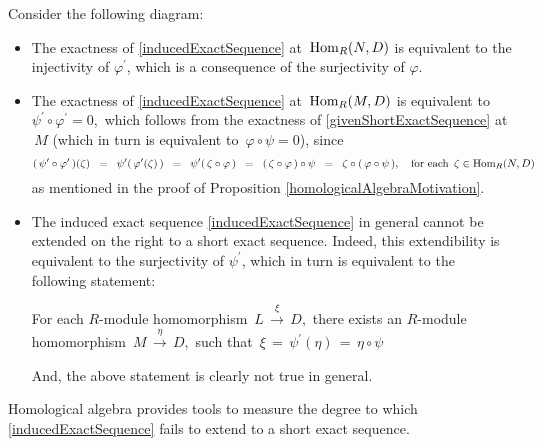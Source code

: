 \vskip 0.5cm
\begin{remark}
\mbox{}
\vskip 0.1cm
\noindent
Consider the following diagram:
\begin{center}
\end{center}
\begin{itemize}
\item
	The exactness of \eqref{inducedExactSequence} at \,$\textnormal{Hom}_{R}(N,D)$
	is equivalent to the injectivity of $\varphi^{\prime}$,
	which is a consequence of the surjectivity of $\varphi$.
\item
	The exactness of \eqref{inducedExactSequence} at \,$\textnormal{Hom}_{R}(M,D)$
	is equivalent to \,$\psi^{\prime}\circ\varphi^{\prime} = 0$,\,
	which follows from the exactness of \eqref{givenShortExactSequence} at \,$M$
	(which in turn is equivalent to \,$\varphi \circ \psi = 0$),
	since
	\begin{equation*}
	(\,\psi^{\prime}\circ\varphi^{\prime}\,)(\zeta)
	\;\; = \;\;
		\psi^{\prime}(\,\varphi^{\prime}(\zeta)\,)
	\;\; = \;\;
		\psi^{\prime}(\,\zeta \circ \varphi\,)
	\;\; = \;\;
		(\,\zeta \circ \varphi\,) \circ \psi
	\;\; = \;\;
		\zeta \circ (\,\varphi \circ \psi\,),
	\quad
		\textnormal{for each \,$\zeta \in \textnormal{Hom}_{R}(N,D)$}
	\end{equation*}
	as mentioned in the proof of Proposition \ref{homologicalAlgebraMotivation}.
\item
	The induced exact sequence \eqref{inducedExactSequence}
	in general cannot be extended on the right to a short exact sequence.
	Indeed, this extendibility is equivalent to the surjectivity of $\psi^{\prime}$,
	which in turn is equivalent to the following statement:
	\begin{center}
	\begin{minipage}{6.0in}
	\textnormal{For each $R$-module homomorphism
	\,$L\,\overset{\xi}{\longrightarrow}\,D$,\,
	there exists an $R$-module homomorphism
	\,$M\,\overset{\eta}{\longrightarrow}\,D$,\,
	such that
	\,$\xi \,=\, \psi^{\prime}(\eta) \,=\, \eta \circ \psi$
	}
	\end{minipage}
	\end{center}
	And, the above statement is clearly not true in general.
\end{itemize}
Homological algebra provides tools to measure the degree to which
\eqref{inducedExactSequence}
{\color{red}fails to extend to a short exact sequence}.
\end{remark}

